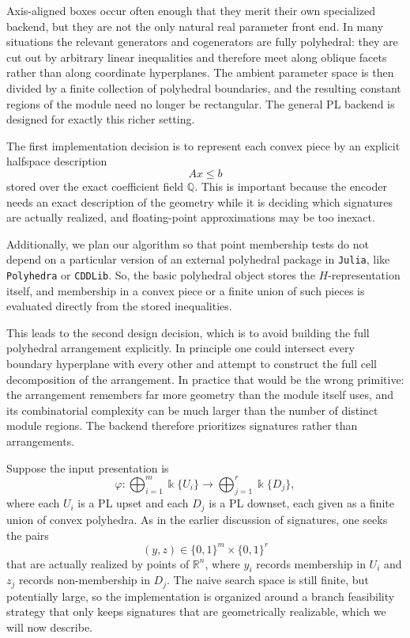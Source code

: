 \documentclass[11pt]{article}
\newcommand{\R}{\mathbb{R}}
\newcommand{\Q}{\mathbb{Q}}
\newcommand{\kk}{\Bbbk}
\theoremstyle{definition}
\theoremstyle{remark}
\begin{document}
Axis-aligned boxes occur often enough that they merit their own specialized backend, but they are not the only natural real parameter front end.  In many situations the relevant generators and cogenerators are fully polyhedral: they are cut out by arbitrary linear inequalities and therefore meet along oblique facets rather than along coordinate hyperplanes.  The ambient parameter space is then divided by a finite collection of polyhedral boundaries, and the resulting constant regions of the module need no longer be rectangular.  The general PL backend is designed for exactly this richer setting.

The first implementation decision is to represent each convex piece by an explicit halfspace description
\[
A x \leq b
\]
stored over the exact coefficient field \( \Q \).  This is important because the encoder needs an exact description of the geometry while it is deciding which signatures are actually realized, and floating-point approximations may be too inexact. 

Additionally, we plan our algorithm so that point membership tests do not depend on a particular version of an external polyhedral package in \texttt{Julia}, like \texttt{Polyhedra} or \texttt{CDDLib}. So, the basic polyhedral object stores the \(H\)-representation itself, and membership in a convex piece or a finite union of such pieces is evaluated directly from the stored inequalities.

This leads to the second design decision, which is to avoid building the full polyhedral arrangement explicitly.  In principle one could intersect every boundary hyperplane with every other and attempt to construct the full cell decomposition of the arrangement.  In practice that would be the wrong primitive: the arrangement remembers far more geometry than the module itself uses, and its combinatorial complexity can be much larger than the number of distinct module regions.  The backend therefore prioritizes signatures rather than arrangements.

Suppose the input presentation is
\[
\varphi \colon \bigoplus_{i=1}^{m} \kk\{U_i\}
\longrightarrow
\bigoplus_{j=1}^{r} \kk\{D_j\},
\]
where each \(U_i\) is a PL upset and each \(D_j\) is a PL downset, each given as a finite union of convex polyhedra.  As in the earlier discussion of signatures, one seeks the pairs
\[
(y,z) \in \{0,1\}^{m} \times \{0,1\}^{r}
\]
that are actually realized by points of \(\R^n\), where \(y_i\) records membership in \(U_i\) and \(z_j\) records non-membership in \(D_j\).  The naive search space is still finite, but potentially large, so the implementation is organized around a branch feasibility strategy that only keeps signatures that are geometrically realizable, which we will now describe.
\end{document}
